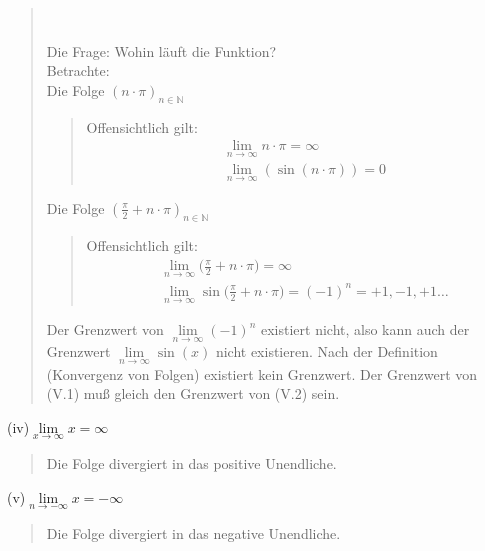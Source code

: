 \begin{quote}
\begin{center}
\begin{tikzpicture} [yscale=2]
		\end{tikzpicture}\\
	\end{center}
Die Frage: Wohin läuft die Funktion?\\
Betrachte:\\
\textbullet \;\;Die Folge $ (n\cdot\pi)_{n\in\mathbb{N}} $\\
\begin{quote}
	Offensichtlich gilt:\\
	\begin{align}
	&\lim\limits_ {n\to\infty} n\cdot\pi=\infty \nonumber\\
	&\lim\limits_ {n\to\infty}(\sin(n\cdot\pi))=0
	\end{align}
\end{quote}
\textbullet \;\;Die Folge $ (\frac{\pi}{2}+n\cdot\pi)_{n\in\mathbb{N}} $\\
\begin{quote}
	Offensichtlich gilt:\\
	\begin{align}
	&\lim\limits_ {n\to\infty}\bigg(\frac{\pi}{2}+n\cdot\pi\bigg)=\infty\nonumber \\
	&\lim\limits_ {n\to\infty}\sin\bigg(\frac{\pi}{2}+n\cdot\pi\bigg)=(-1)^n=+1,-1,+1\ldots
	\end{align}
\end{quote}
Der Grenzwert von $ \lim\limits_ {n\to\infty}(-1)^n $ existiert nicht, also kann auch der Grenzwert $ \lim\limits_ {n\to\infty}\sin(x) $ nicht existieren.
Nach der Definition (Konvergenz von Folgen) existiert kein Grenzwert. Der Grenzwert von (V.1) muß gleich den Grenzwert von (V.2) sein.\vspace*{2mm}\\
\end{quote}
(iv)\;\;$ \lim\limits_ {x\to\infty} x=\infty$\\
\begin{quote}
	Die Folge divergiert in das positive Unendliche.\\
\end{quote}
(v)\;\;$\lim\limits_ {n\to-\infty}x=-\infty$\\
\begin{quote}
	Die Folge divergiert in das negative Unendliche.\\
\end{quote}
